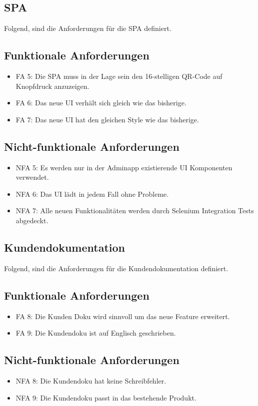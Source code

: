 \subsection{SPA}

Folgend, sind die Anforderungen für die SPA definiert.

\subsection*{Funktionale Anforderungen}
\begin{itemize}
	\item FA 5: Die SPA muss in der Lage sein den 16-stelligen QR-Code auf Knopfdruck anzuzeigen.
	\item FA 6: Das neue UI verhält sich gleich wie das bisherige.
	\item FA 7: Das neue UI hat den gleichen Style wie das bisherige.
\end{itemize}

\subsection*{Nicht-funktionale Anforderungen}
\begin{itemize}
	\item NFA 5: Es werden nur in der Adminapp existierende UI Komponenten verwendet.
	\item NFA 6: Das UI lädt in jedem Fall ohne Probleme.
	\item NFA 7: Alle neuen Funktionalitäten werden durch Selenium Integration Tests abgedeckt.
\end{itemize}

\subsection{Kundendokumentation}

Folgend, sind die Anforderungen für die Kundendokumentation definiert.

\subsection*{Funktionale Anforderungen}
\begin{itemize}
	\item FA 8: Die Kunden Doku wird sinnvoll um das neue Feature erweitert.
	\item FA 9: Die Kundendoku ist auf Englisch geschrieben.
\end{itemize}

\subsection*{Nicht-funktionale Anforderungen}
\begin{itemize}
	\item NFA 8: Die Kundendoku hat keine Schreibfehler. 
	\item NFA 9: Die Kundendoku passt in das bestehende Produkt.
\end{itemize}